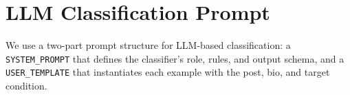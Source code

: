 \documentclass[11pt]{article}
\begin{document}





\section{LLM Classification Prompt}
\label{app:prompt}

We use a two-part prompt structure for LLM-based classification: a \texttt{SYSTEM\_PROMPT} that defines the classifier's role, rules, and output schema, and a \texttt{USER\_TEMPLATE} that instantiates each example with the post, bio, and target condition.
\end{document}
